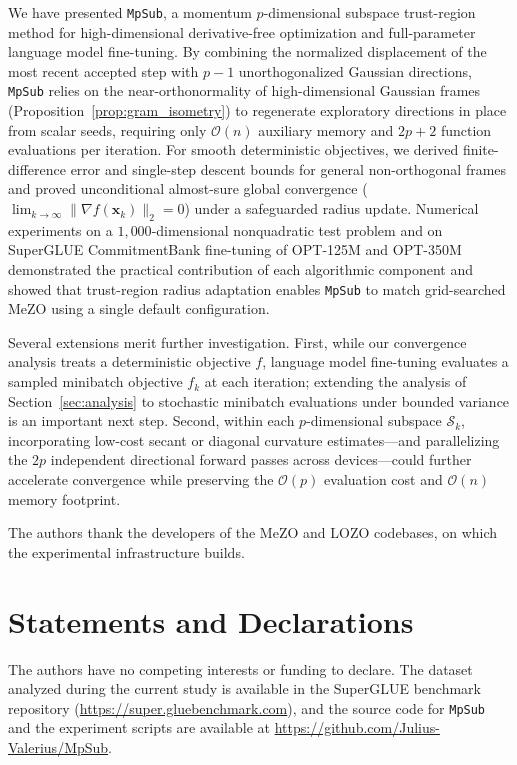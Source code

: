 \documentclass[smallextended]{svjour3}
\newcommand{\bx}{\bm{x}}
\begin{document}
We have presented \texttt{MpSub}, a momentum $p$-dimensional subspace trust-region method for high-dimensional derivative-free optimization and full-parameter language model fine-tuning. By combining the normalized displacement of the most recent accepted step with $p-1$ unorthogonalized Gaussian directions, \texttt{MpSub} relies on the near-orthonormality of high-dimensional Gaussian frames (Proposition~\ref{prop:gram_isometry}) to regenerate exploratory directions in place from scalar seeds, requiring only $\mathcal{O}(n)$ auxiliary memory and $2p+2$ function evaluations per iteration. For smooth deterministic objectives, we derived finite-difference error and single-step descent bounds for general non-orthogonal frames and proved unconditional almost-sure global convergence ($\lim_{k\to\infty} \|\nabla f(\bx_k)\|_2 = 0$) under a safeguarded radius update. Numerical experiments on a $1{,}000$-dimensional nonquadratic test problem and on SuperGLUE CommitmentBank fine-tuning of OPT-125M and OPT-350M demonstrated the practical contribution of each algorithmic component and showed that trust-region radius adaptation enables \texttt{MpSub} to match grid-searched MeZO using a single default configuration.

Several extensions merit further investigation. First, while our convergence analysis treats a deterministic objective $f$, language model fine-tuning evaluates a sampled minibatch objective $f_k$ at each iteration; extending the analysis of Section~\ref{sec:analysis} to stochastic minibatch evaluations under bounded variance is an important next step. Second, within each $p$-dimensional subspace $\mathcal S_k$, incorporating low-cost secant or diagonal curvature estimates---and parallelizing the $2p$ independent directional forward passes across devices---could further accelerate convergence while preserving the $\mathcal{O}(p)$ evaluation cost and $\mathcal{O}(n)$ memory footprint.

\begin{acknowledgements}
The authors thank the developers of the MeZO and LOZO codebases, on which the experimental infrastructure builds.
\end{acknowledgements}

\section*{Statements and Declarations}
The authors have no competing interests or funding to declare. The dataset analyzed during the current study is available in the SuperGLUE benchmark repository (\url{https://super.gluebenchmark.com}), and the source code for \texttt{MpSub} and the experiment scripts are available at \url{https://github.com/Julius-Valerius/MpSub}.



\end{document}
